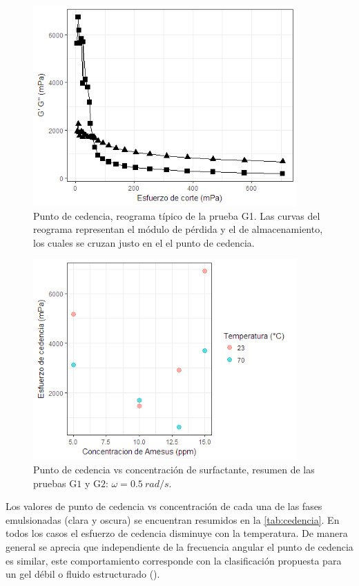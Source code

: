 \begin{figure}[h]
    \centering
    \includegraphics[width=0.9\textwidth]{R_plot/Rplot14.png}
    \caption[Punto de cedencia]{Punto de cedencia, reograma típico de la prueba G1. Las curvas del reograma representan el módulo de pérdida y el de almacenamiento, los cuales se cruzan justo en el el punto de cedencia.}
    \label{fig:cedencia1}
\end{figure}

\begin{figure}[h]
    \centering
    \includegraphics[width=0.9\textwidth]{R_plot/Rplot15.png}
    \caption[Prueba G$2$ ]{Punto de cedencia vs concentración de surfactante, resumen de las pruebas G$1$ y G$2$: $\omega = 0.5~rad/s$.}
    \label{fig:cedencia2}
\end{figure}


Los valores de punto de cedencia vs concentración de cada una de las fases emulsionadas (clara y oscura) se encuentran resumidos en la \autoref{tab:cedencia}. En todos los casos el esfuerzo de cedencia disminuye con la temperatura. De manera general se aprecia que independiente de la frecuencia angular el punto de cedencia es similar, este comportamiento corresponde con la clasificación propuesta para un gel débil o fluido estructurado (\cite{Clark}).

